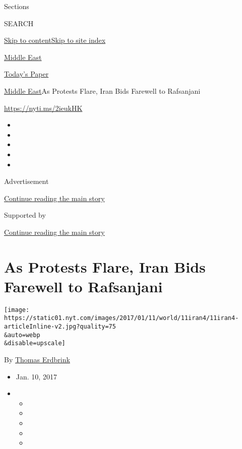 Sections

SEARCH

\protect\hyperlink{site-content}{Skip to
content}\protect\hyperlink{site-index}{Skip to site index}

\href{https://www.nytimes.com/section/world/middleeast}{Middle East}

\href{https://myaccount.nytimes.com/auth/login?response_type=cookie\&client_id=vi}{}

\href{https://www.nytimes.com/section/todayspaper}{Today's Paper}

\href{/section/world/middleeast}{Middle East}\textbar{}As Protests
Flare, Iran Bids Farewell to Rafsanjani

\url{https://nyti.ms/2ieukHK}

\begin{itemize}
\item
\item
\item
\item
\item
\end{itemize}

Advertisement

\protect\hyperlink{after-top}{Continue reading the main story}

Supported by

\protect\hyperlink{after-sponsor}{Continue reading the main story}

\hypertarget{as-protests-flare-iran-bids-farewell-to-rafsanjani}{%
\section{As Protests Flare, Iran Bids Farewell to
Rafsanjani}\label{as-protests-flare-iran-bids-farewell-to-rafsanjani}}

\texttt{[image: https://static01.nyt.com/images/2017/01/11/world/11iran4/11iran4-articleInline-v2.jpg?quality=75\\\&auto=webp\\\&disable=upscale]}

By \href{http://www.nytimes.com/by/thomas-erdbrink}{Thomas Erdbrink}

\begin{itemize}
\item
  Jan. 10, 2017
\item
  \begin{itemize}
  \item
  \item
  \item
  \item
  \item
  \end{itemize}
\end{itemize}

